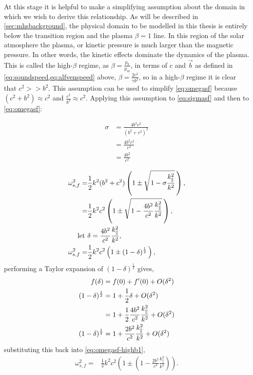 At this stage it is helpful to make a simplifying assumption about the domain in which we wish to derive this relationship.
As will be described in \cref{sec:mhsbackground}, the physical domain to be modelled in this thesis is entirely below the transition region and the plasma $\beta = 1$ line.
In this region of the solar atmosphere the plasma, or kinetic pressure is much larger than the magnetic pressure.
In other words, the kinetic effects dominate the dynamics of the plasma.
This is called the high-$\beta$ regime, as $\displaystyle\beta = \frac{p_k}{p_m}$, in terms of $c$ and $\vec{b}$ as defined in \cref{eq:soundspeed,eq:alfvenspeed} above, $\displaystyle\beta = \frac{2c^2}{\gamma b^2}$, so in a high-$\beta$ regime it is clear that $c^2 >> b^2$.
This assumption can be used to simplify \cref{eq:omegasf} because $(c^2 + b^2) \approx c^2$ and $\displaystyle \frac{c^2}{b^2} \approx c^2$.
Applying this assumption to \cref{eq:sigmasf} and then to \cref{eq:omegasf}:

\begin{align}
    \sigma &= \frac{4b^2c^2}{(b^2+c^2)^2}\\
           &= \frac{4b^2c^2}{c^4}\\
           &= \frac{4b^2}{c^2}
\end{align}

\begin{align}
    \omega^2_{s,f} =& \frac{1}{2}k^2(b^2+c^2)\left(1 \pm \sqrt{1 - \sigma \frac{k^2_\parallel}{k^2}}\,\right),\\
                   =& \frac{1}{2}k^2c^2\left(1 \pm \sqrt{1 - \frac{4b^2}{c^2} \frac{k^2_\parallel}{k^2}}\,\right),\\
    \text{let }& \delta = \frac{4b^2}{c^2} \frac{k^2_\parallel}{k^2},\notag\\
    \omega^2_{s,f} =& \frac{1}{2}k^2c^2\left(1 \pm (1 - \delta)^{\frac{1}{2}}\,\right),\label{eq:omegasf-highb1}
\end{align}
performing a Taylor expansion of $(1-\delta)^{\frac{1}{2}}$ gives,
\begin{align}
    f(\delta) &= f(0) + f^\prime(0) + O(\delta^2)\notag\\
    (1-\delta)^{\frac{1}{2}} &= 1 + \frac{1}{2}\delta + O(\delta^2)\\
                             &= 1 + \frac{1}{2}\frac{4b^2}{c^2} \frac{k^2_\parallel}{k^2} + O(\delta^2)\\
    (1-\delta)^{\frac{1}{2}} &= 1 + \frac{2b^2}{c^2} \frac{k^2_\parallel}{k^2} + O(\delta^2)
\end{align}
substituting this back into \cref{eq:omegasf-highb1},
\begin{align}
    \omega^2_{s,f} =& \frac{1}{2}k^2c^2\left(1 \pm \left(1 - \frac{2b^2}{c^2} \frac{k^2_\parallel}{k^2}\right)\right).
\end{align}

